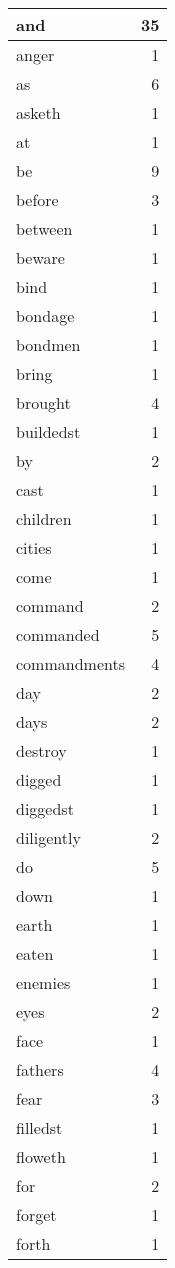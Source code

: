 \begin{center}
\begin{longtable}{l|r}
and & 35 \\ \hline
anger & 1 \\ \hline
as & 6 \\ \hline
asketh & 1 \\ \hline
at & 1 \\ \hline
be & 9 \\ \hline
before & 3 \\ \hline
between & 1 \\ \hline
beware & 1 \\ \hline
bind & 1 \\ \hline
bondage & 1 \\ \hline
bondmen & 1 \\ \hline
bring & 1 \\ \hline
brought & 4 \\ \hline
buildedst & 1 \\ \hline
by & 2 \\ \hline
cast & 1 \\ \hline
children & 1 \\ \hline
cities & 1 \\ \hline
come & 1 \\ \hline
command & 2 \\ \hline
commanded & 5 \\ \hline
commandments & 4 \\ \hline
day & 2 \\ \hline
days & 2 \\ \hline
destroy & 1 \\ \hline
digged & 1 \\ \hline
diggedst & 1 \\ \hline
diligently & 2 \\ \hline
do & 5 \\ \hline
down & 1 \\ \hline
earth & 1 \\ \hline
eaten & 1 \\ \hline
enemies & 1 \\ \hline
eyes & 2 \\ \hline
face & 1 \\ \hline
fathers & 4 \\ \hline
fear & 3 \\ \hline
filledst & 1 \\ \hline
floweth & 1 \\ \hline
for & 2 \\ \hline
forget & 1 \\ \hline
forth & 1 \\ \hline

\end{longtable}
\end{center}
